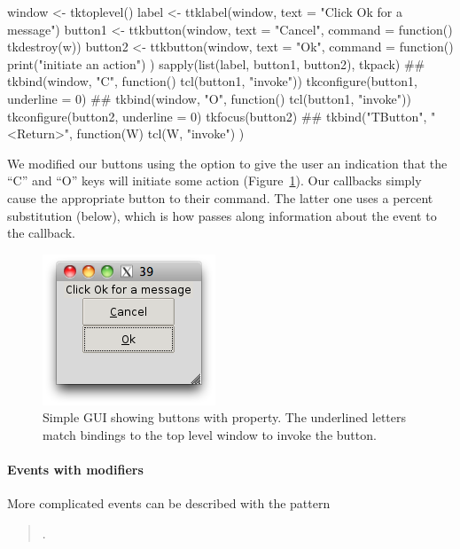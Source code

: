 \begin{Schunk}
\begin{Sinput}
 window <- tktoplevel()
 label <- ttklabel(window, text = "Click Ok for a message")
 button1 <- ttkbutton(window, text = "Cancel", 
                 command = function() tkdestroy(w))
 button2 <- ttkbutton(window, text = "Ok", command = function() {
   print("initiate an action")
 })
 sapply(list(label, button1, button2), tkpack)
 ##
 tkbind(window, "C", function() tcl(button1, "invoke"))
 tkconfigure(button1, underline = 0)
 ##
 tkbind(window, "O", function() tcl(button1, "invoke"))
 tkconfigure(button2, underline = 0)
 tkfocus(button2)
 ##
 tkbind("TButton", "<Return>", function(W) {
   tcl(W, "invoke")
 })
\end{Sinput}
\end{Schunk}
%
We modified our buttons using the  option to give the
user an indication that the ``C'' and ``O'' keys will initiate some
action (Figure~\ref{fig:tcltk-underline-buttons}). Our callbacks
simply cause the appropriate button to  their
command. The latter one uses a percent substitution (below), which is
how \TK\/ passes along information about the event to the callback.

\begin{figure}
  \centering
  \includegraphics[width=.35\textwidth]{fig-tcltk-underline-buttons.png}
  \caption{Simple GUI showing buttons with 
    property. The underlined letters match bindings to the top level
    window to invoke the button.}
  \label{fig:tcltk-underline-buttons}
\end{figure}

\paragraph{Events with modifiers}
More complicated events can be described with the pattern

\begin{quotation}
.   
\end{quotation}

